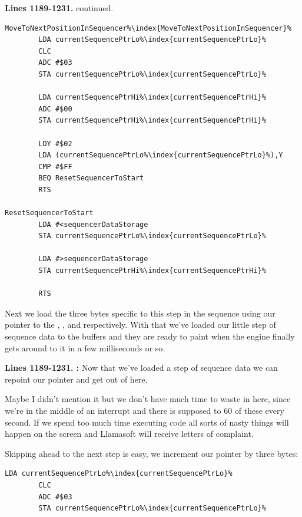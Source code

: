 \clearpage
\textbf{Lines 1189-1231. } continued.
\begin{lstlisting}[escapechar=\%]
MoveToNextPositionInSequencer%\index{MoveToNextPositionInSequencer}%   
        LDA currentSequencePtrLo%\index{currentSequencePtrLo}%
        CLC 
        ADC #$03
        STA currentSequencePtrLo%\index{currentSequencePtrLo}%

        LDA currentSequencePtrHi%\index{currentSequencePtrHi}%
        ADC #$00
        STA currentSequencePtrHi%\index{currentSequencePtrHi}%

        LDY #$02
        LDA (currentSequencePtrLo%\index{currentSequencePtrLo}%),Y
        CMP #$FF
        BEQ ResetSequencerToStart
        RTS 

ResetSequencerToStart   
        LDA #<sequencerDataStorage
        STA currentSequencePtrLo%\index{currentSequencePtrLo}%

        LDA #>sequencerDataStorage
        STA currentSequencePtrHi%\index{currentSequencePtrHi}%

        RTS 
\end{lstlisting}

\clearpage

Next we load the three bytes specific to this step in the sequence using our pointer  to the , , and
 respectively. With that we've loaded our little step of sequence data to the buffers and they are ready to paint when the engine finally gets around to it
in a few milliseconds or so.


\textbf{Lines 1189-1231. :}  Now that we've loaded a step of sequence data we can repoint our pointer and get out of here. 

Maybe I didn't
mention it but we don't have much time to waste in here, since we're in the middle of an interrupt and there is supposed to 60 of these every second. If we spend too much time executing
code all sorts of nasty things will happen on the screen and Llamasoft will receive letters of complaint. 

Skipping ahead to the next step is easy, we increment our pointer by three bytes:
\begin{lstlisting}[escapechar=\%]
        LDA currentSequencePtrLo%\index{currentSequencePtrLo}%
        CLC 
        ADC #$03
        STA currentSequencePtrLo%\index{currentSequencePtrLo}%
\end{lstlisting}

